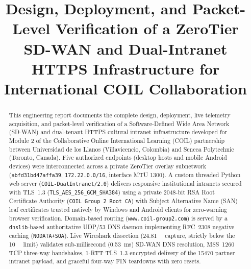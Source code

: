 \documentclass[conference]{IEEEtran}
\begin{document}
\title{Design, Deployment, and Packet-Level Verification of a ZeroTier SD-WAN and Dual-Intranet HTTPS Infrastructure for International COIL Collaboration}

\author{
}

\maketitle

\begin{abstract}
This engineering report documents the complete design, deployment, live telemetry acquisition, and packet-level verification of a Software-Defined Wide Area Network (SD-WAN) and dual-tenant HTTPS cultural intranet infrastructure developed for Module 2 of the Collaborative Online International Learning (COIL) partnership between Universidad de los Llanos (Villavicencio, Colombia) and Seneca Polytechnic (Toronto, Canada). Five authorized endpoints (desktop hosts and mobile Android devices) were interconnected across a private ZeroTier overlay subnetwork (\texttt{abfd31bd47affa39}, \texttt{172.22.0.0/16}, interface MTU \qty{1300}{\byte}). A custom threaded Python web server (\texttt{COIL-DualIntranet/2.0}) delivers responsive institutional intranets secured with TLS~1.3 (\texttt{TLS\_AES\_256\_GCM\_SHA384}) using a private 2048-bit RSA Root Certificate Authority (\texttt{COIL Group 2 Root CA}) with Subject Alternative Name (SAN) leaf certificates trusted natively by Windows and Android clients for zero-warning browser verification. Domain-based routing (\texttt{www.coil-group2.com}) is served by a \texttt{dnslib}-based authoritative UDP/53 DNS daemon implementing RFC~2308 negative caching (\texttt{NODATA+SOA}). Live Wireshark dissection (\qty{24.81}{\kilo\byte} capture, strictly below the \qty{10}{\mega\byte} limit) validates sub-millisecond (\qty{0.53}{\milli\second}) SD-WAN DNS resolution, MSS~\qty{1260}{\byte} TCP three-way handshakes, 1-RTT TLS~1.3 encrypted delivery of the \qty{15470}{\byte} partner intranet payload, and graceful four-way FIN teardowns with zero resets.
\end{abstract}
\end{document}
